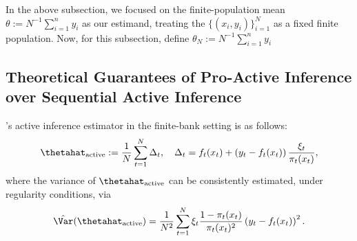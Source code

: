 \documentclass[11pt]{article}
\begin{document}
In the above subsection, we focused on the finite-population mean $\theta := N^{-1} \sum_{i=1}^n y_i$ as our estimand, treating the $\{ (x_i, y_i )\}_{i=1}^N$ as a fixed finite population. Now, for this subsection, define $\theta_N := N^{-1} \sum_{i=1}^n y_i$

\subsection{Theoretical Guarantees of Pro-Active Inference over Sequential Active Inference}

\cite{zrnic2024active}'s active inference estimator in the finite-bank setting is as follows:
\begin{align*}
    \thetahat_{\text{active}} := \frac{1}{N} \sum_{t=1}^N \Delta_t, \quad \Delta_t = f_t(x_t) + \left( y_t - f_t(x_t) \right) \frac{\xi_t}{\pi_t(x_t)},
\end{align*}
where the variance of $\thetahat_{\text{active}}$ can be consistently estimated, under regularity conditions, via
\begin{align*}
    \hat{\Var}(\thetahat_{\text{active}}) = \frac{1}{N^2} \sum_{t=1}^N \xi_t \frac{1 - \pi_t(x_t)}{\pi_t(x_t)^2} \left( y_t - f_t(x_t)\right)^2.
\end{align*}
\end{document}
